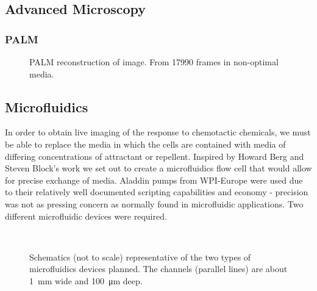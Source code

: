 \documentclass[../main.tex]{subfiles}
\begin{document}
\subsection{Advanced Microscopy}
\subsubsection{PALM}


\begin{figure}[h!]
\begin{center}
\caption[PALM reconstruction]{PALM reconstruction of image. From 17990 frames in non-optimal media.}
\label{fig:results:palm}
\end{center}
\end{figure}
\newpage
\subsection{Microfluidics}

In order to obtain live imaging of the response to chemotactic chemicals, we must be able to replace the media in which the cells are contained with media of differing concentrations of attractant or repellent. Inspired by Howard Berg and Steven Block's work\citep{berg84} we set out to create a microfluidics flow cell that would allow for precise exchange of media. Aladdin pumps from WPI-Europe were used due to their relatively well documented scripting capabilities and economy - precision was not as pressing concern as normally found in microfluidic applications. Two different microfluidic devices were required.

\begin{figure}[h!]
\begin{center}
\\
\caption[Microfluidics devices]{Schematics (not to scale) representative of the two types of microfluidics devices planned. The channels (parallel lines) are about \SI{1}{\milli\meter} wide and \SI{100}{\micro\meter} deep.}
\label{fig:microfluidics}
\end{center}
\end{figure}
\end{document}
